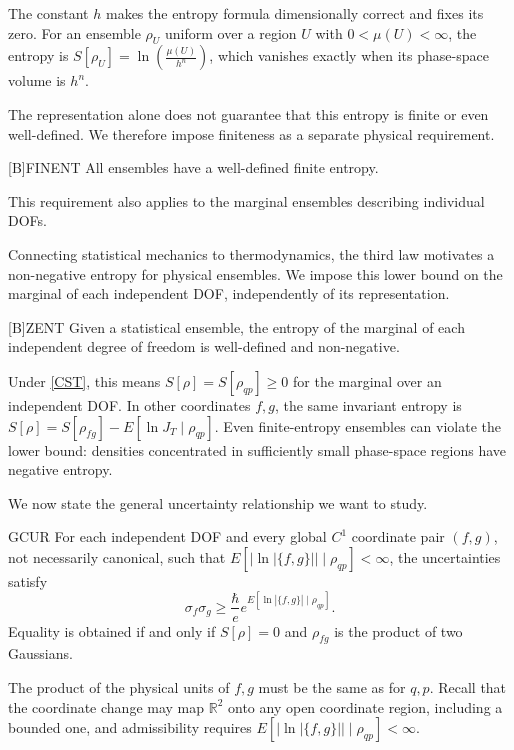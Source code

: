 \documentclass{techbrief}
\begin{document}
The constant $h$ makes the entropy formula dimensionally correct and fixes its zero. For an ensemble $\rho_U$ uniform over a region $U$ with $0<\mu(U)<\infty$, the entropy is $S[\rho_U]=\ln\left(\frac{\mu(U)}{h^n}\right)$, which vanishes exactly when its phase-space volume is $h^n$.

The representation alone does not guarantee that this entropy is finite or even well-defined. We therefore impose finiteness as a separate physical requirement.
\begin{condition}{[B]FINENT}
	All ensembles have a well-defined finite entropy.
\end{condition}
This requirement also applies to the marginal ensembles describing individual DOFs.

Connecting statistical mechanics to thermodynamics, the third law motivates a non-negative entropy for physical ensembles. We impose this lower bound on the marginal of each independent DOF, independently of its representation.

\begin{condition}{[B]ZENT}
	Given a statistical ensemble, the entropy of the marginal of each independent degree of freedom is well-defined and non-negative.
\end{condition}

Under \ref{CST}, this means $S[\rho]=S[\rho_{qp}]\geq0$ for the marginal over an independent DOF. In other coordinates $f,g$, the same invariant entropy is $S[\rho]=S[\rho_{fg}]-E[\ln J_T\mid\rho_{qp}]$. Even finite-entropy ensembles can violate the lower bound: densities concentrated in sufficiently small phase-space regions have negative entropy.

We now state the general uncertainty relationship we want to study.
\begin{condition}{GCUR}
	For each independent DOF and every global $C^1$ coordinate pair $(f,g)$, not necessarily canonical, such that $E[\left|\ln|\{f,g\}|\right|\mid\rho_{qp}]<\infty$, the uncertainties satisfy
	\begin{equation*}
		\sigma_f\sigma_g\geq\frac{\hbar}{e}e^{E[\ln|\{f,g\}|\mid\rho_{qp}]}.
	\end{equation*}
	Equality is obtained if and only if $S[\rho]=0$ and $\rho_{fg}$ is the product of two Gaussians.
\end{condition}
The product of the physical units of $f,g$ must be the same as for $q,p$. Recall that the coordinate change may map $\mathbb{R}^2$ onto any open coordinate region, including a bounded one, and admissibility requires $E[\left|\ln|\{f,g\}|\right|\mid\rho_{qp}]<\infty$.
\end{document}
